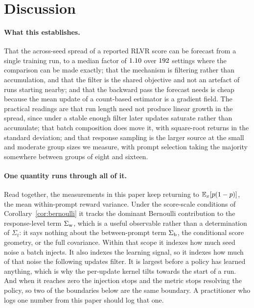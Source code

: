 \section{Discussion}
\label{sec:discussion}

\paragraph{What this establishes.} That the across-seed spread of a reported RLVR score can be
forecast from a single training run, to a median factor of $1.10$ over
$192$ settings where the comparison can be made exactly; that the mechanism is filtering rather than accumulation, and that
the filter is the shared objective and not an artefact of runs starting nearby; and that the
backward pass the forecast needs is cheap because the mean update of a count-based estimator is a
gradient field. The practical readings are that run length need not produce linear growth in the
spread, since under a stable enough filter later updates saturate rather than accumulate; that
batch composition does move it, with square-root returns in the standard deviation; and that
response sampling is the larger source at the small and moderate group sizes we measure, with
prompt selection taking the majority somewhere between groups of eight and sixteen.

\paragraph{One quantity runs through all of it.} Read together, the measurements in this paper
keep returning to $\mathbb{E}_x[p(1-p)]$, the mean within-prompt reward variance. Under the score-scale
conditions of Corollary~\ref{cor:bernoulli} it tracks the dominant Bernoulli contribution to the
response-level term $\Sigma_{\mathrm{w}}$, which is a useful observable rather than a determination of
$\Sigma_t$: it says nothing about the between-prompt term $\Sigma_{\mathrm{b}}$, the conditional score geometry,
or the full covariance. Within that scope it indexes how much seed noise a batch injects. It also
indexes the learning signal, so it indexes how much of that
noise the following updates filter. It is largest before a policy has learned anything, which is
why the per-update kernel tilts towards the start of a run. And when it reaches zero the injection
stops and the metric stops resolving the policy, so two of the boundaries below are the same
boundary. A practitioner who logs one
number from this paper should log that one.

